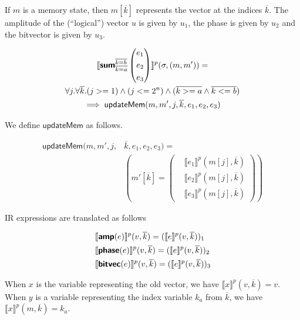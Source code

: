 \documentclass[runningheads]{llncs}
\newcommand {\sem} [1] {\llbracket #1 \rrbracket}
\newcommand {\Psem} [1] {\sem{#1}^p}
\newcommand {\ir} [1] {\textsf{\textbf{#1}}}
\newcommand {\irSum} {\ir{sum}}
\newcommand {\irAmp} {\ir{amp}}
\newcommand {\irPhase} {\ir{phase}}
\newcommand {\irBV} {\ir{bitvec}}
\newcommand {\updateMem} {\textsf{updateMem}}
\begin{document}
If $m$ is a memory state, then $m[\overline{k}]$ represents the vector at the indices $\overline{k}$. The amplitude of the (``logical'') vector $u$ is given by $u_1$, the phase is given by $u_2$ and the bitvector is given by $u_3$.

\begin{multline*}
  \Psem{\irSum_{\overline{k=a}}^{\overline{k=b}}
    \left(\begin{aligned}
      &e_1\\
      &e_2\\
      &e_3
    \end{aligned}\right)}(\sigma, (m, m')) =\\
    \forall j. \forall \overline{k}. (j >= 1) \land (j <= 2^n) \land (\overline{k >= a} \land \overline{k <= b})\\
    \implies \updateMem(m, m', j, \overline{k}, e_1, e_2, e_3)
\end{multline*}

We define $\updateMem$ as follows.

\[
\begin{aligned}
  \updateMem(m, m', j, &\overline{k}, e_1, e_2, e_3) =\\
    &\left(m'[\overline{k}] = \left(\begin{aligned}
                          &\Psem{e_1}(m[j], \overline{k})\\
                          &\Psem{e_2}(m[j], \overline{k})\\
                          &\Psem{e_3}(m[j], \overline{k})
    \end{aligned}\right)\right)
\end{aligned}
\]

\noindent
IR expressions are translated as follows

\begin{align*}
  &\Psem{\irAmp(e)}(v, \overline{k}) = (\Psem{e}(v, \overline{k}))_1\\
  &\Psem{\irPhase(e)}(v, \overline{k}) = (\Psem{e}(v, \overline{k}))_2\\
  &\Psem{\irBV(e)}(v, \overline{k}) = (\Psem{e}(v, \overline{k}))_3
\end{align*}

When $x$ is the variable representing the old vector, we have $\Psem{x}(v, \overline{k}) = v$. When $y$ is a variable representing the index variable $k_a$ from $\overline{k}$, we have $\Psem{x}(m, \overline{k}) = k_a$.
\end{document}
